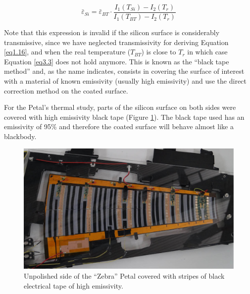 		\begin{equation}\label{eq3.3}
			\bar{\varepsilon}_{Si} = \bar{\varepsilon}_{BT} \cdot \frac{I_{1}(T_{Si}) - I_{2}(T_{r})}{I_{1}(T_{BT}) - I_{2}(T_{r})}
		\end{equation}\bigskip
	
		Note that this expression is invalid if the silicon surface is considerably transmissive, since we have neglected transmissivity for deriving Equation \ref{eq1.16}, and when the real temperature ($T_{BT}$) is close to $T_{r}$ in which case Equation \ref{eq3.3} does not hold anymore. This is known as the “black tape method” and, as the name indicates, consists in covering the surface of interest with a material of known emissivity (usually high emissivity) and use the direct correction method on the coated surface.
		
		For the Petal’s thermal study, parts of the silicon surface on both sides were covered with high emissivity black tape (Figure \ref{fig3.2}). The black tape used has an emissivity of 95\% and therefore the coated surface will behave almost like a blackbody. 
	
		\begin{figure}[ht!]
			\centering
			\captionsetup{justification=centering,margin=2cm}
			\includegraphics[scale=0.40]{Figures/Chapter03/ZebraPetal.jpg}
			\caption{Unpolished side of the “Zebra” Petal covered with stripes of black electrical tape of high emissivity.}\label{fig3.2}
		\end{figure}
	
